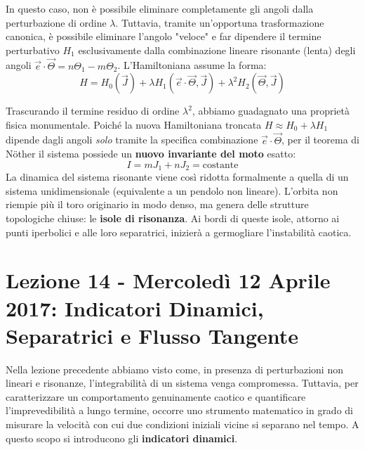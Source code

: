 \documentclass[12pt,a4paper]{article}
\begin{document}
In questo caso, non è possibile eliminare completamente gli angoli dalla perturbazione di ordine $\lambda$. Tuttavia, tramite un'opportuna trasformazione canonica, è possibile eliminare l'angolo "veloce" e far dipendere il termine perturbativo $H_1$ esclusivamente dalla combinazione lineare risonante (lenta) degli angoli $\vec{e} \cdot \vec{\Theta} = n\Theta_1 - m\Theta_2$. L'Hamiltoniana assume la forma:
\begin{equation}
H = H_0(\vec{J}) + \lambda H_1(\vec{e} \cdot \vec{\Theta}, \vec{J}) + \lambda^2 H_2(\vec{\Theta}, \vec{J})
\end{equation}

Trascurando il termine residuo di ordine $\lambda^2$, abbiamo guadagnato una proprietà fisica monumentale. Poiché la nuova Hamiltoniana troncata $H \approx H_0 + \lambda H_1$ dipende dagli angoli \textit{solo} tramite la specifica combinazione $\vec{e} \cdot \vec{\Theta}$, per il teorema di Nöther il sistema possiede un \textbf{nuovo invariante del moto} esatto:
\begin{equation}
I = m J_1 + n J_2 = \text{costante}
\end{equation}
La dinamica del sistema risonante viene così ridotta formalmente a quella di un sistema unidimensionale (equivalente a un pendolo non lineare). L'orbita non riempie più il toro originario in modo denso, ma genera delle strutture topologiche chiuse: le \textbf{isole di risonanza}. Ai bordi di queste isole, attorno ai punti iperbolici e alle loro separatrici, inizierà a germogliare l'instabilità caotica.


\newpage

\section{Lezione 14 - Mercoledì 12 Aprile 2017: Indicatori Dinamici, Separatrici e Flusso Tangente}

Nella lezione precedente abbiamo visto come, in presenza di perturbazioni non lineari e risonanze, l'integrabilità di un sistema venga compromessa. Tuttavia, per caratterizzare un comportamento genuinamente caotico e quantificare l'imprevedibilità a lungo termine, occorre uno strumento matematico in grado di misurare la velocità con cui due condizioni iniziali vicine si separano nel tempo. A questo scopo si introducono gli \textbf{indicatori dinamici}.
\end{document}
